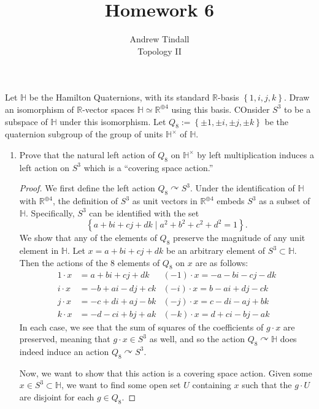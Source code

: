 \documentclass[12pt]{article}
\newcommand{\R}{\mathbb{R}}
\theoremstyle{definition}
\newenvironment{problem}[2][Problem]{\begin{trivlist}
\item[\hskip \labelsep {\bfseries #1}\hskip \labelsep {\bfseries #2.}]}{\end{trivlist}}
\begin{document}
 
 
\title{Homework 6}
\author{Andrew Tindall\\ Topology II}
\maketitle
\begin{problem}{1}
	Let $\mathbb H$ be the Hamilton Quaternions, with its standard $\R$-basis $\left\{ 1, i, j, k \right\}$. Draw an isomorphism of $\R$-vector spaces $\mathbb H \simeq \R^{\oplus 4}$ using this basis. COnsider $S^3$ to be a subspace of $\mathbb H$ under this isomorphism. Let $Q_8 := \left\{ \pm 1, \pm i, \pm j, \pm k \right\}$ be the quaternion subgroup of the group of units $\mathbb H^\times$ of $\mathbb H$. 
	\begin{enumerate}[label=(\alph*)]
		\item Prove that the natural left action of $Q_8$ on $\mathbb H^\times$ by left multiplication induces a left action on $S^3$ which is a ``covering space action.''
			\begin{proof}
				We first define the left action $Q_8 \curvearrowright S^3$. Under the identification of $\mathbb H$ with $\R^{\oplus 4}$, the definition of $S^3$ as unit vectors in $\R^{\oplus 4}$ embeds $S^3$ as a subset of $\mathbb H$. Specifically, $S^3$ can be identified with the set
				\[ \left\{ a + bi + cj + dk \mid a^2 + b^2 + c^2 + d^2 = 1 \right\}.\]
				We show that any of the elements of $Q_8$ preserve the magnitude of any unit element in $\mathbb H$. Let $x = a + bi + cj + dk$ be an arbitrary element of $S^3 \subset \mathbb H$. Then the actions of the $8$ elements of $Q_8$ on $x$ are as follows:
				\begin{align*}
					1\cdot x &= a + bi + cj + dk & (-1)\cdot x = -a - bi - cj - dk\\
					i \cdot x &= -b + ai - dj + ck & (-i) \cdot x = b - ai + dj - ck\\
					j \cdot x &= -c + di + aj - bk & (-j) \cdot x = c - di - aj + bk\\
					k \cdot x &= - d - ci + bj + ak &(-k) \cdot x = d + ci - bj - ak
				\end{align*}
				In each case, we see that the sum of squares  of the coefficients of $g \cdot x$ are preserved, meaning that $g \cdot x \in S^3$ as well, and so the action $Q_8 \curvearrowright \mathbb H$ does indeed induce an action $Q_8 \curvearrowright S^3$.
				\par Now, we want to show that this action is a covering space action. Given some $x \in S^3 \subset \mathbb H$, we want to find some open set $U$ containing $x$ such that the $g \cdot U$ are disjoint for each $g \in Q_8$. 

\end{proof}
\end{enumerate}
\end{problem}
\end{document}

